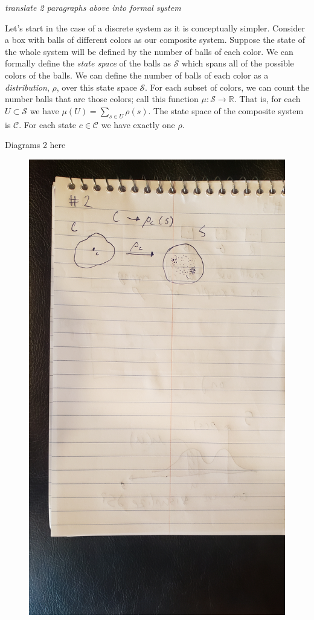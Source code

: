 \documentclass{article}
\begin{document}
	 \emph{translate 2 paragraphs above into formal system}
	
	Let's start in the case of a discrete system as it is conceptually simpler. Consider a box with balls of different colors as our composite system. Suppose the state of the whole system will be defined by the number of balls of each color. We can formally define the \textit{state space} of the balls as $\mathcal{S}$ which spans all of the possible colors of the balls. We can define the number of balls of each color as a \textit{distribution}, $\rho$, over this state space $\mathcal{S}$. For each subset of colors, we can count the number balls that are those colors; call this function $\mu : \mathcal{S} \to \mathbb{R}$. That is, for each $U \subset \mathcal{S}$ we have $\mu(U) = \sum_{s \in U} \rho(s)$. The state space of the composite system is $\mathcal{C}$. For each state $c \in \mathcal{C}$ we have exactly one $\rho$.
	
Diagrams 2 here
\begin{figure}
\includegraphics[width=\textwidth]{diagram2.jpg}
\end{figure}
	
\end{document}
